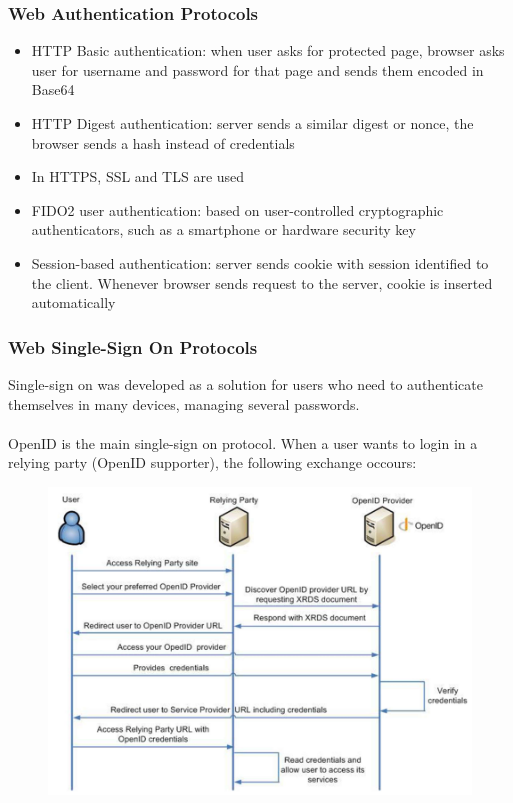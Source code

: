\documentclass[10pt,a4paper]{report}
\begin{document}
\subsubsection{Web Authentication Protocols}
\begin{itemize}
\item HTTP Basic authentication: when user asks for protected page, browser asks user for username and password for that page and sends them encoded in Base64
\item HTTP Digest authentication: server sends a similar digest or nonce, the browser sends a hash instead of credentials
\item In HTTPS, SSL and TLS are used
\item FIDO2 user authentication: based on user-controlled cryptographic authenticators, such as a smartphone or hardware security key
\item Session-based authentication: server sends cookie with session identified to the client. Whenever browser sends request to the server, cookie is inserted automatically
\end{itemize}
\subsubsection{Web Single-Sign On Protocols}
Single-sign on was developed as a solution for users who need to authenticate themselves in many devices, managing several passwords.\\
\\
OpenID is the main single-sign on protocol. When a user wants to login in a relying party (OpenID supporter), the following exchange occours:
\begin{figure}[H]
\centering
\includegraphics[scale=0.4]{31.png}
\end{figure}
\end{document}
